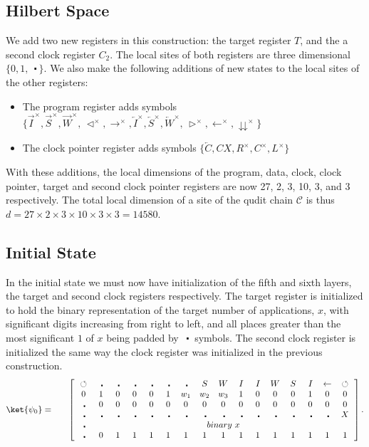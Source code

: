 \documentclass[11pt,letterpaper]{article}
\newcommand{\<}{\langle}
\renewcommand{\>}{\rangle}
\newcommand{\tur}{\,\circlearrowleft\,}   %
\newcommand{\mov}{\,\vartriangleleft}    %
\newcommand{\rmov}{\,\vartriangleright}
\newcommand{\bul}{\:\:\centerdot\:}       %
\newcommand{\iga}{\:I\,}                  %
\newcommand{\li}{\overleftarrow{I}}
\newcommand{\wga}{W}						%
\newcommand{\lw}{\overleftarrow{W}}
\newcommand{\sga}{\:S\,}					%
\newcommand{\ls}{\overleftarrow{S}}
\begin{document}
\subsection{Hilbert Space}
We add two new registers in this construction: the target register $T$, and the a second clock register $C_2$. The local sites of both registers are three dimensional $\{0,1,\bul\}$. We also make the following additions of new states to the local sites of the other registers:
\begin{itemize}
	\item The program register adds symbols $\{\overrightarrow{I}^{\times},\overrightarrow{S}^{\times},\overrightarrow{W}^{\times},\mov^{\times},\rightarrow^{\times},\li^{\times},\ls^{\times},\lw^{\times},\rmov^{\times},\leftarrow^{\times},\downdownarrows^{\times}\}$
	\item The clock pointer register adds symbols $\{\overleftarrow{C},CX, R^{\times},C^{\times}, L^{\times}\}$
\end{itemize}
With these additions, the local dimensions of the program, data, clock, clock pointer, target and second clock pointer registers are now 27, 2, 3, 10, 3, and 3 respectively. The total local dimension of a site of the qudit chain $\mathcal{C}$ is thus $d=27\times 2\times 3 \times 10\times 3\times 3=14580$.
\subsection{Initial State}
In the initial state we must now have initialization of the fifth and sixth layers, the target and second clock registers respectively. The target register is initialized to hold the binary representation of the target number of applications, $x$, with significant digits increasing from right to left, and all places greater than the most significant $1$ of $x$ being padded by $\bul$ symbols. The second clock register is initialized the same way the clock register was initialized in the previous construction.
\begin{eqnarray}
	\ket{\psi_{0}} &=& \quad \left[ \begin{array}{cccccccccccccccc}
		\tur & \bul &
		\bul & \bul & \bul & \bul & \bul & \sga & \wga & \iga & \iga & 
		\wga & \sga & \iga & \leftarrow & \tur
		\\		
		0 & 1    & 0    & 0    & 0    & 1    & 
		w_1 & w_2 & w_3
		 &
		1    & 0    & 0    & 0    & 1	& 0	& 0
		\\
		\bul & 0 & 0 & 0 & 0 & 0 & 0 & 0 & 0 & 0 & 0 & 0 & 0 & 0 & 0 & 0
		\\
		\bul & \bul & \bul & \bul & \bul & \bul & \bul & \bul & \bul & \bul & \bul & \bul & \bul & \bul & \bul & X
		\\
		\bul & \multicolumn{15}{c}{binary~x}
		\\
		\bul & 0 & 1 & 1 & 1 & 1 & 1 & 1 & 1 & 1 & 1 & 1 & 1 & 1 & 1 & 1
 	\end{array} \right]. \label{psi03}
\end{eqnarray}
\end{document}
